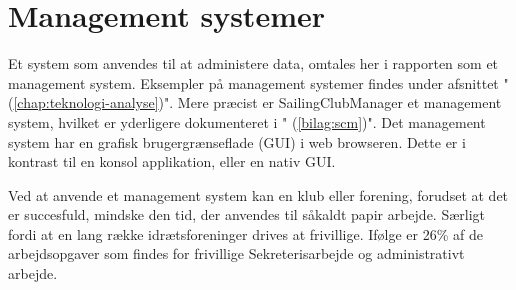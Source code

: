 \section{Management systemer}\label{sec:management-systemer}

\cbstart

Et system som anvendes til at administere data, omtales her i rapporten som et management system. 
Eksempler på management systemer findes under afsnittet "  (\ref{chap:teknologi-analyse})". 
Mere præcist er SailingClubManager et management system, hvilket er yderligere dokumenteret i "  (\ref{bilag:scm})". 
Det management system har en grafisk brugergrænseflade (GUI) i web browseren. 
Dette er i kontrast til en konsol applikation, eller en nativ GUI. 
\newline 

Ved at anvende et management system kan en klub eller forening, forudset at det er succesfuld, mindske den tid, der anvendes til såkaldt papir arbejde. Særligt fordi at en lang række idrætsforeninger drives at frivillige. 
Ifølge \cite{Frivilligrapporten} er 26\% af de arbejdsopgaver som findes for frivillige Sekreterisarbejde og administrativt arbejde. 




\cbend
